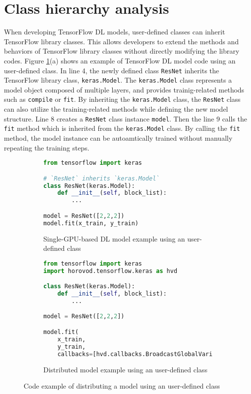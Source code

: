 \section{Class hierarchy analysis}\label{sec:cha}

When developing TensorFlow DL models, user-defined classes can
inherit TensorFlow library classes. 
This allows developers to extend the methods and behaviors of TensorFlow
library classes without directly modifying the library codes. 
Figure \ref{fig:cha:tfex}(a) shows an example of TensorFlow DL model
code using an user-defined class.
In line 4, the newly defined class {\tt ResNet} inherits the TensorFlow
library class, {\tt keras.Model}.
The {\tt keras.Model} class represents a model object composed of multiple
layers, and provides trainig-related methods such as {\tt compile} or {\tt fit}.
By inheriting the {\tt keras.Model} class, the {\tt ResNet} class
can also utilize the training-related methods while defining the new model
structure.
Line 8 creates a {\tt ResNet} class instance {\tt model}.
Then the line 9 calls the {\tt fit} method which is inherited from the
{\tt keras.Model} class.
By calling the {\tt fit} method, the model instance can be autoamtically
trained without manually repeating the training steps.

\begin{figure}[!ht]
  \centering
  \begin{subfigure}[t]{0.35\textwidth}
    \begin{lstlisting}[language=Python]
from tensorflow import keras

# `ResNet` inherits `keras.Model`
class ResNet(keras.Model): 
    def __init__(self, block_list):
        ...

model = ResNet([2,2,2])
model.fit(x_train, y_train)\end{lstlisting}
    \caption{Single-GPU-based DL model example using an user-defined class}
  \end{subfigure}
  \hspace{3mm}
  \begin{subfigure}[t]{0.6\textwidth}
    \begin{lstlisting}[language=Python]
from tensorflow import keras
import horovod.tensorflow.keras as hvd

class ResNet(keras.Model):
    def __init__(self, block_list):
        ...

model = ResNet([2,2,2])

model.fit(
    x_train, 
    y_train,
    callbacks=[hvd.callbacks.BroadcastGlobalVariablesCallback(0)])\end{lstlisting}
    \caption{Distributed model example using an user-defined class}
  \end{subfigure}

  \caption{Code example of distributing a model using an user-defined class}
  \label{fig:cha:tfex}
\end{figure}

